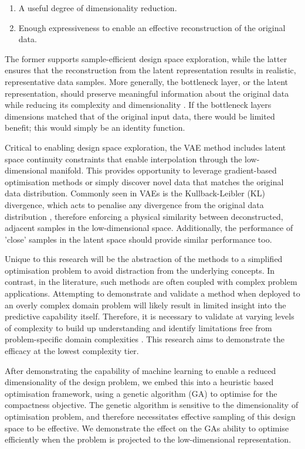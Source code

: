 \documentclass{article}
\begin{document}
\begin{enumerate}
    \item A useful degree of dimensionality reduction.
    \item Enough expressiveness to enable an effective reconstruction of the original data.
\end{enumerate}

The former supports sample-efficient design space exploration, while the latter ensures that the reconstruction from the latent representation results in realistic, representative data samples. More generally, the bottleneck layer, or the latent representation, should preserve meaningful information about the original data while reducing its complexity and dimensionality \citep{Zheng2023}. If the bottleneck layers dimensions matched that of the original input data, there would be limited benefit; this would simply be an identity function. 

Critical to enabling design space exploration, the VAE method includes latent space continuity constraints that enable interpolation through the low-dimensional manifold. This provides opportunity to leverage gradient-based optimisation methods or simply discover novel data that matches the original data distribution. Commonly seen in VAEs is the Kullback-Leibler (KL) divergence, which acts to penalise any divergence from the original data distribution \citep{Zheng2023}, therefore enforcing a physical similarity between deconstructed, adjacent samples in the low-dimensional space. Additionally, the performance of 'close' samples in the latent space should provide similar performance too.

Unique to this research will be the abstraction of the methods to a simplified optimisation problem to avoid distraction from the underlying concepts. In contrast, in the literature, such methods are often coupled with complex problem applications. Attempting to demonstrate and validate a method when deployed to an overly complex domain problem will likely result in limited insight into the predictive capability itself. Therefore, it is necessary to validate at varying levels of complexity to build up understanding and identify limitations free from problem-specific domain complexities \citep{Hobbs2021}. This research aims to demonstrate the efficacy at the lowest complexity tier.

After demonstrating the capability of machine learning to enable a reduced dimensionality of the design problem, we embed this into a heuristic based optimisation framework, using a genetic algorithm (GA) to optimise for the compactness objective. The genetic algorithm is sensitive to the dimensionality of optimisation problem, and therefore necessitates effective sampling of this design space to be effective. We demonstrate the effect on the GAs ability to optimise efficiently when the problem is projected to the low-dimensional representation.
\end{document}
